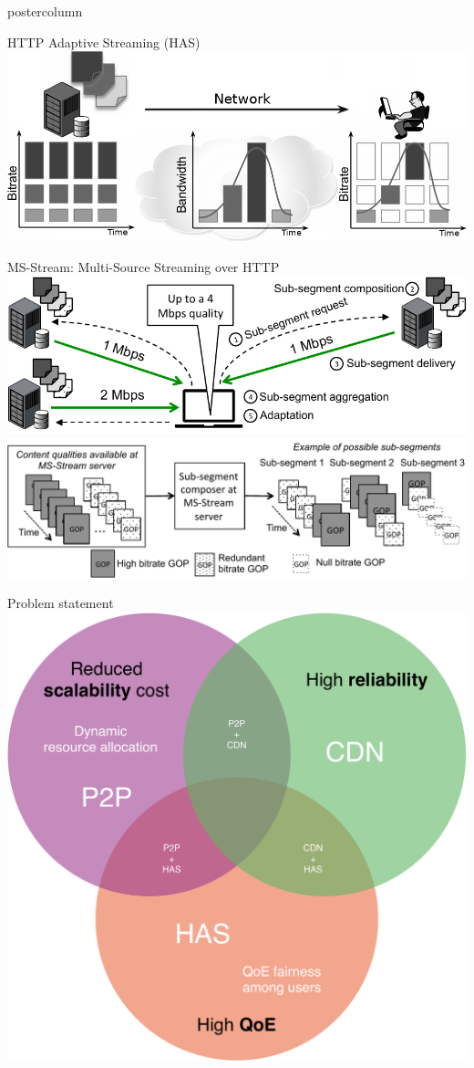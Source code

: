 \begin{frame}
\begin{columns}
\begin{column}{.49\textwidth}
\begin{beamercolorbox}[center,wd=\textwidth]{postercolumn}
\begin{minipage}[T]{.95\textwidth}
{            \begin{block}{HTTP Adaptive Streaming (HAS)}
            \centering
            \includegraphics[width=.925\textwidth]{sample/DASH-2.png}
            \end{block}
            
            \begin{block}{MS-Stream: Multi-Source Streaming over HTTP}
            \centering
            \includegraphics[width=.925\textwidth]{sample/msstream_archi.pdf}
            \includegraphics[width=.925\textwidth]{sample/chunk2.pdf}
            \end{block}
            
            \begin{block}{Problem statement}
            \centering
            \includegraphics[width=.5\textwidth]{sample/SotA-cropped.pdf}
            

\end{block}}
\end{minipage}
\end{beamercolorbox}
\end{column}
\end{columns}
\end{frame}
